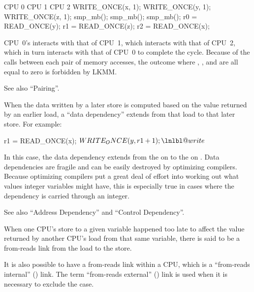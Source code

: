 \begin{description}[style=nextline]
\begin{VerbatimU}
	CPU 0                CPU 1                CPU 2
	WRITE_ONCE(x, 1);    WRITE_ONCE(y, 1);    WRITE_ONCE(z, 1);
	smp_mb();            smp_mb();            smp_mb();
	r0 = READ_ONCE(y);   r1 = READ_ONCE(z);   r2 = READ_ONCE(x);
\end{VerbatimU}

	CPU~0's  interacts with that of CPU~1, which interacts
	with that of CPU~2, which in turn interacts with that of CPU~0
	to complete the cycle.
	Because of the  calls between each pair of memory
	accesses, the outcome where , , and  are all equal to
	zero is forbidden by LKMM\@.

	See also ``Pairing''.

  \item[Data Dependency:]
	When the data written by a later store is computed based
	on the value returned by an earlier load, a ``data dependency''
	extends from that load to that later store.
	For example:

\begin{fcvlabel}
\begin{VerbatimN}[commandchars=\\\@\$]
	r1 = READ_ONCE(x);      \lnlbl@read$
	WRITE_ONCE(y, r1 + 1);  \lnlbl@write$
\end{VerbatimN}
\end{fcvlabel}

	\begin{fcvref}
	In this case, the data dependency extends from the 
	on  to the  on .
	Data dependencies are fragile and can be easily destroyed by
        optimizing compilers.
	Because optimizing compilers put a great deal of effort into
	working out what values integer variables might have, this is
	especially true in cases where the dependency is carried through
	an integer.
	\end{fcvref}

	See also ``Address Dependency'' and ``Control Dependency''.

  \item[From-Reads (\tco{fr}):]
	When one CPU's store to a given variable happened
	too late to affect the value returned by another CPU's
	load from that same variable, there is said to be a from-reads
	link from the load to the store.

	It is also possible to have a from-reads link within a CPU, which
	is a ``from-reads internal'' () link.
	The term ``from-reads external'' () link is used when
	it is necessary to exclude the  case.


\end{description}

